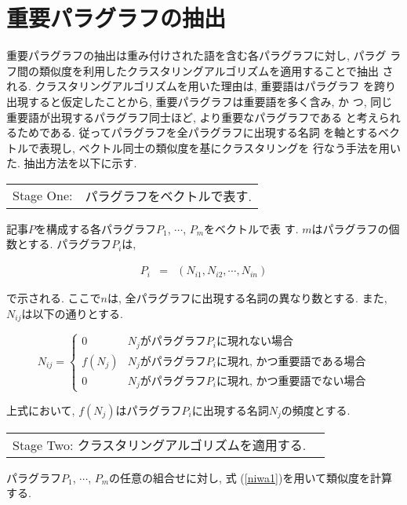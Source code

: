 \section{重要パラグラフの抽出}

重要パラグラフの抽出は重み付けされた語を含む各パラグラフに対し, パラグ
ラフ間の類似度を利用したクラスタリングアルゴリズムを適用することで抽出
される.  クラスタリングアルゴリズムを用いた理由は, 重要語はパラグラフ
を跨り出現すると仮定したことから, 重要パラグラフは重要語を多く含み, か
つ, 同じ重要語が出現するパラグラフ同士ほど, より重要なパラグラフである
と考えられるためである.  従ってパラグラフを全パラグラフに出現する名詞
を軸とするベクトルで表現し, ベクトル同士の類似度を基にクラスタリングを
行なう手法を用いた.  抽出方法を以下に示す.

\begin{tabular}{ll}
\sf Stage One: &パラグラフをベクトルで表す. \\
\end{tabular}

記事$P$を構成する各パラグラフ$P_{1}$, $\cdots$, $P_{m}$をベクトルで表
す.  $m$はパラグラフの個数とする.  パラグラフ$P_{i}$は,

\begin{eqnarray}
P_{i} & = & (N_{i1},N_{i2},\cdots,N_{in}) \label{1aa}  
\end{eqnarray}

\noindent
で示される.  ここで$n$\hspace{-0.1mm}は, 全パラグラフに出現する名詞の異なり数とする.
また, $N_{ij}$\hspace{-0.1mm}は以下の通りとする.

\[ N_{ij} = \left\{ \begin{array}{ll}
0 & \mbox{$N_{j}$がパラグラフ$P_{i}$に現れない場合} \\
f(N_{j}) & \mbox{$N_{j}$がパラグラフ$P_{i}$に現れ, かつ重要語である場合} \\
0 & \mbox{$N_{j}$がパラグラフ$P_{i}$に現れ, かつ重要語でない場合}
\end{array}
\right. \]

\noindent
上式において, $f(N_{j})$はパラグラフ$P_{i}$に出現する名詞$N_{j}$の頻度とする.

\begin{tabular}{ll}
\sf Stage Two: クラスタリングアルゴリズムを適用する.
\end{tabular}

パラグラフ$P_{1}$, $\cdots$, $P_{m}$の任意の組合せに対し, 式
(\ref{niwa1})を用いて類似度を計算する.  

